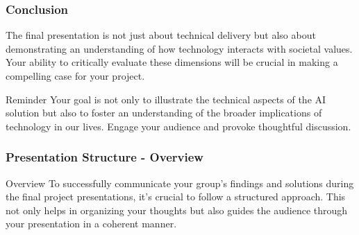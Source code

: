 \documentclass[aspectratio=169]{beamer}
\begin{document}
\begin{frame}[fragile]
    \frametitle{Conclusion}

    The final presentation is not just about technical delivery but also about demonstrating an understanding of how technology interacts with societal values. Your ability to critically evaluate these dimensions will be crucial in making a compelling case for your project.

    \begin{block}{Reminder}
        Your goal is not only to illustrate the technical aspects of the AI solution but also to foster an understanding of the broader implications of technology in our lives. Engage your audience and provoke thoughtful discussion.
    \end{block}
\end{frame}

\begin{frame}[fragile]
    \frametitle{Presentation Structure - Overview}
    \begin{block}{Overview}
        To successfully communicate your group's findings and solutions during the final project presentations, it's crucial to follow a structured approach. 
        This not only helps in organizing your thoughts but also guides the audience through your presentation in a coherent manner.
    \end{block}
\end{frame}
\end{document}
